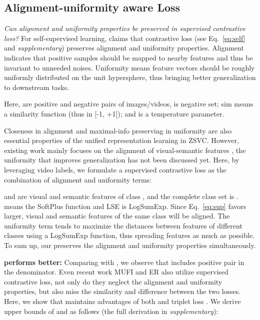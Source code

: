 \documentclass[10pt,twocolumn,letterpaper]{article}
\begin{document}
\subsection{Alignment-uniformity aware Loss}
{\em Can alignment and uniformity properties be preserved in supervised contrastive loss?}
For self-supervised learning, \cite{chen2020intriguing} claims that contrastive loss \cite{chen2020simple,qian2021spatiotemporal} (see Eq.~\ref{eq:self} and {\em supplementary}) preserves alignment and uniformity properties.
Alignment indicates that positive samples should be mapped to nearby features and thus be invariant to unneeded noises.
Uniformity \cite{wang2020understanding} means feature vectors should be roughly uniformly distributed on the unit hypersphere, thus bringing better generalization to downstream tasks.

\noindent

Here,  are positive and negative pairs of images/videos,  is negative set; sim means a similarity function (thus in [-1, +1]); and  is a temperature parameter.

Closeness in alignment and maximal-info preserving in uniformity are also essential properties of the unified representation learning in ZSVC.
However, existing work mainly focuses on the alignment of visual-semantic features \cite{zhu2018towards,bishay2019tarn,hahn2019action2vec,brattoli2020rethinking}, the uniformity that improves generalization has not been discussed yet.
Here, by leveraging video labels, we formulate a supervised contrastive loss as the combination of alignment and uniformity terms:

 and  are visual and semantic features of class , and the complete class set is .  means the SoftPlus function and LSE is LogSumExp. 
Since Eq.~\ref{eq:sup} favors  larger, visual and semantic features of the same class will be aligned.
The uniformity term tends to maximize the distances between features of different classes using a LogSumExp function, thus spreading features as much as possible.
To sum up, our  preserves the alignment and uniformity properties simultaneously.



{\bf  performs better:} Comparing  with , we observe that  includes positive pair  in the denominator.
Even recent work MUFI \cite{qiu2021boosting} and ER \cite{chen2021elaborative} also utilize supervised contrastive loss, not only do they neglect the alignment and uniformity properties, but also miss the similarity and difference between the two losses.
Here, we show that  maintains advantages of both  and triplet loss \cite{schroff2015facenet}.
We derive upper bounds of  and  as follows (the full derivation in {\em supplementary}):
\end{document}
